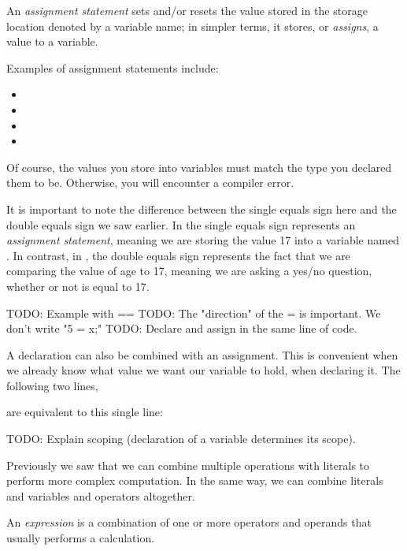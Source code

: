\begin{definition}
An \emph{assignment statement} sets and/or resets the value stored in the storage location denoted by a variable name; in simpler terms, it stores, or \emph{assigns}, a value to a variable.
\end{definition}

\noindent Examples of assignment statements include:
\begin{itemize}
 \item {}
 \item {}
 \item {}
 \item {}
\end{itemize}
Of course, the values you store into variables must match the type you declared them to be. Otherwise, you will encounter a compiler error. 

It is important to note the difference between the single equals sign here and the double equals sign we saw earlier. In  the single equals sign represents an \emph{assignment statement}, meaning we are storing the value 17 into a variable named . In contrast, in , the double equals sign represents the fact that we are comparing the value of age to 17, meaning we are asking a yes/no question, whether or not  is equal to 17. 

TODO: Example with ==
TODO: The "direction" of the = is important. We don't write "5 = x;"
TODO: Declare and assign in the same line of code.


A declaration can also be combined with an assignment. This is convenient when we already know what value we want our variable to hold, when declaring it. The following two lines,


are equivalent to this single line:


TODO: Explain scoping (declaration of a variable determines its scope).

Previously we saw that we can combine multiple operations with literals to perform more complex computation. In the same way, we can combine literals and variables and operators altogether.

\begin{definition}
An \emph{expression} is a combination of one or more operators and operands that usually performs a calculation.
\end{definition}

